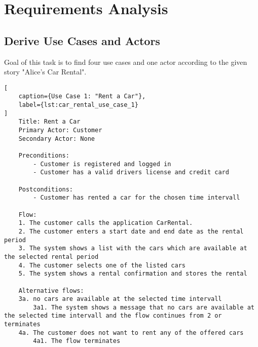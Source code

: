 \label{cha:requirements_analysis}

\section{Requirements Analysis}

\subsection{Derive Use Cases and Actors}
Goal of this task is to find four use cases and one actor according to the given story "Alice's Car Rental".

\begin{lstlisting}[
    caption={Use Case 1: "Rent a Car"},
    label={lst:car_rental_use_case_1}
]
    Title: Rent a Car
    Primary Actor: Customer
    Secondary Actor: None

    Preconditions:
        - Customer is registered and logged in
        - Customer has a valid drivers license and credit card

    Postconditions:
        - Customer has rented a car for the chosen time intervall

    Flow:
    1. The customer calls the application CarRental.
    2. The customer enters a start date and end date as the rental period
    3. The system shows a list with the cars which are available at the selected rental period
    4. The customer selects one of the listed cars
    5. The system shows a rental confirmation and stores the rental

    Alternative flows:
    3a. no cars are available at the selected time intervall
        3a1. The system shows a message that no cars are available at the selected time intervall and the flow continues from 2 or terminates
    4a. The customer does not want to rent any of the offered cars
        4a1. The flow terminates    
\end{lstlisting}



